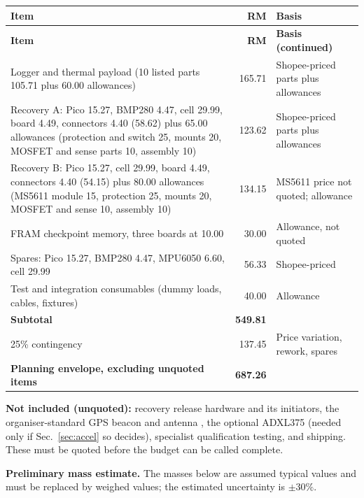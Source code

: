 \small
{}
\begin{longtable}{@{}L{62mm}r L{58mm}@{}}
\toprule{}\textbf{Item}&\textbf{RM}&\textbf{Basis}\\\midrule\endfirsthead
\toprule{}\textbf{Item}&\textbf{RM}&\textbf{Basis (continued)}\\\midrule\endhead
\bottomrule\endlastfoot
Logger and thermal payload (10 listed parts 105.71 plus 60.00 allowances) & 165.71 & Shopee-priced parts plus allowances\\
Recovery A: Pico 15.27, BMP280 4.47, cell 29.99, board 4.49, connectors 4.40 (58.62) plus 65.00 allowances (protection and switch 25, mounts 20, MOSFET and sense parts 10, assembly 10) & 123.62 & Shopee-priced parts plus allowances\\
Recovery B: Pico 15.27, cell 29.99, board 4.49, connectors 4.40 (54.15) plus 80.00 allowances (MS5611 module 15, protection 25, mounts 20, MOSFET and sense 10, assembly 10) & 134.15 & MS5611 price not quoted; allowance\\
FRAM checkpoint memory, three boards at 10.00 & 30.00 & Allowance, not quoted\\
Spares: Pico 15.27, BMP280 4.47, MPU6050 6.60, cell 29.99 & 56.33 & Shopee-priced\\
Test and integration consumables (dummy loads, cables, fixtures) & 40.00 & Allowance\\
\midrule
\textbf{Subtotal} & \textbf{549.81} & \\
25\% contingency & 137.45 & Price variation, rework, spares\\
\textbf{Planning envelope, excluding unquoted items} & \textbf{687.26} & \\
\bottomrule
\end{longtable}
\normalsize

\textbf{Not included (unquoted):} recovery release hardware and its initiators, the organiser-standard GPS beacon and antenna \cite{rtc2027app03}, the optional ADXL375 (needed only if Sec.~\ref{sec:accel} so decides), specialist qualification testing, and shipping. These must be quoted before the budget can be called complete.

\textbf{Preliminary mass estimate.} The masses below are assumed typical values and must be replaced by weighed values; the estimated uncertainty is $\pm30\%$.

